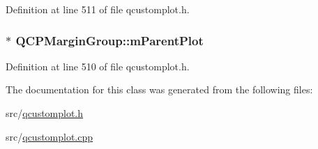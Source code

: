 Definition at line 511 of file qcustomplot.\-h.

\hypertarget{class_q_c_p_margin_group_a23cfa29e3cc0f33a59141b77d8c04edf}{
\subsubsection[{m\-Parent\-Plot}]{$\ast$ Q\-C\-P\-Margin\-Group\-::m\-Parent\-Plot\hspace{0.3cm}{\ttfamily [protected]}}}\label{class_q_c_p_margin_group_a23cfa29e3cc0f33a59141b77d8c04edf}


Definition at line 510 of file qcustomplot.\-h.



The documentation for this class was generated from the following files\-:\begin{DoxyCompactItemize}
\item 
src/\hyperlink{qcustomplot_8h}{qcustomplot.\-h}\item 
src/\hyperlink{qcustomplot_8cpp}{qcustomplot.\-cpp}\end{DoxyCompactItemize}
